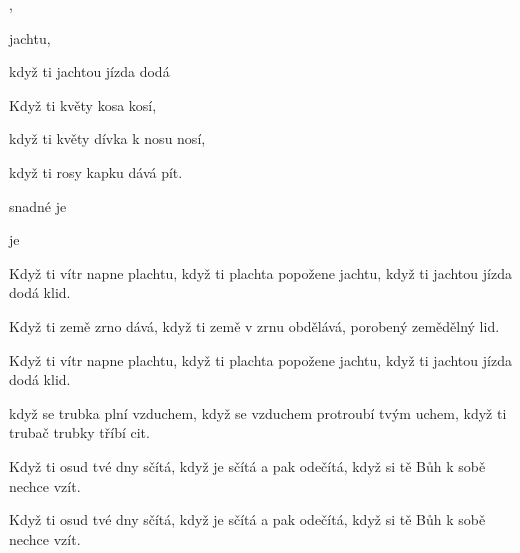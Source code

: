 

   

\zs
{}   ,

   jachtu,

když ti jachtou jízda dodá 
  
\ks

\zs
Když ti květy kosa kosí,

když ti květy dívka k nosu nosí,

když ti rosy kapku dává pít.
\ks

\zr
{} snadné je 

 je 
\kr

\zs
Když ti vítr napne plachtu,
když ti plachta popožene jachtu,
když ti jachtou jízda dodá klid.
\ks

\zs
Když ti země zrno dává,
když ti země v zrnu obdělává,
porobený zemědělný lid.
\ks

\zr \kr

\zs
Když ti vítr napne plachtu,
když ti plachta popožene jachtu,
když ti jachtou jízda dodá klid.
\ks

\zs
když se trubka plní vzduchem,
když se vzduchem protroubí tvým uchem,
když ti trubač trubky tříbí cit.
\ks

\zr \kr

\zs
Když ti osud tvé dny sčítá,
když je sčítá a pak odečítá,
když si tě Bůh k sobě nechce vzít.
\ks

\zs
Když ti osud tvé dny sčítá,
když je sčítá a pak odečítá,
když si tě Bůh k sobě nechce vzít.
\ks

\zr \kr

\kp


















